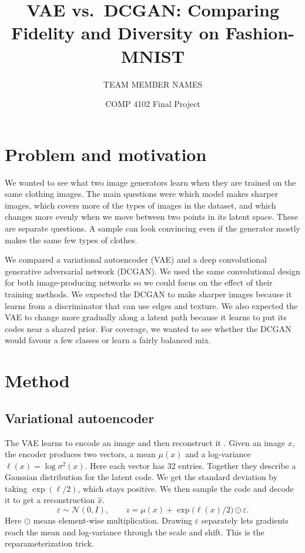 \documentclass[11pt,letterpaper]{article}
\title{VAE vs.\ DCGAN: Comparing Fidelity and Diversity on Fashion-MNIST}
\author{TEAM MEMBER NAMES}
\date{COMP 4102 Final Project}
\begin{document}
\maketitle

\section{Problem and motivation}

We wanted to see what two image generators learn when they are trained on the
same clothing images. The main questions were which model makes sharper
images, which covers more of the types of images in the dataset, and which
changes more evenly when we move between two points in its latent space.
These are separate questions. A sample can look convincing even if the
generator mostly makes the same few types of clothes.

We compared a variational autoencoder (VAE) and a deep convolutional
generative adversarial network (DCGAN). We used the same convolutional
design for both image-producing networks so we could focus on the effect of
their training methods. We expected the DCGAN to make sharper images because
it learns from a discriminator that can use edges and texture. We also
expected the VAE to change more gradually along a latent path because it
learns to put its codes near a shared prior. For coverage, we wanted to see
whether the DCGAN would favour a few classes or learn a fairly balanced mix.

\section{Method}

\subsection{Variational autoencoder}

The VAE learns to encode an image and then reconstruct it
\cite{kingma2014}. Given an image \(x\), the encoder produces two vectors,
a mean \(\mu(x)\) and a log-variance \(\ell(x)=\log\sigma^2(x)\). Here each
vector has 32 entries. Together they describe a Gaussian distribution for
the latent code. We get the standard deviation by taking
\(\exp(\ell/2)\), which stays positive. We then sample the code and decode
it to get a reconstruction \(\hat{x}\).
\[
  \varepsilon \sim \mathcal{N}(0,I),
  \qquad
  z = \mu(x) + \exp\bigl(\ell(x)/2\bigr)\odot\varepsilon.
\]
Here \(\odot\) means element-wise multiplication. Drawing \(\varepsilon\)
separately lets gradients reach the mean and log-variance through the
scale and shift. This is the reparameterization trick.
\end{document}
